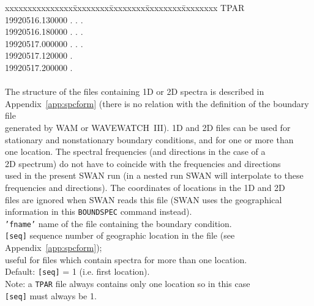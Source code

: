 \documentclass[12pt]{book}
\begin{document}
\begin{tabbing}
                           xxxxxxxxxxxxxxx\=xxxxxxxx\=xxxxxxxx\=xxxxxxxx\=xxxxxxxx \kill
                           TPAR\\
                           19920516.130000   .  .  .\\
                           19920516.180000   .  .  .\\
                           19920517.000000   .   .  .\\
                           19920517.120000     .   \\
                           19920517.200000     .   \\
                                           \>          \>          \>           \>       \\
                        \poptabs
                        The structure of the files containing 1D or 2D spectra is described in\\
                        Appendix~\ref{app:spcform} (there is no relation with the definition of the boundary file\\
                        generated by WAM or WAVEWATCH~III). 1D and 2D files can be used for\\
                        stationary and nonstationary boundary conditions, and for one or more than\\
                        one location. The spectral frequencies (and directions in the case of a\\
                        2D spectrum) do not have to coincide with the frequencies and directions\\
                        used in the present SWAN run (in a nested run SWAN will interpolate to these\\
                        frequencies and directions). The coordinates of locations in the 1D and 2D\\
                        files are ignored when SWAN reads this file (SWAN uses the geographical\\
                        information in this {\tt BOUNDSPEC} command instead).\-\\
{\tt {'fname'}}      \> name of the file containing the boundary condition.\\
{\tt [seq]}          \> sequence number of geographic location in the file (see Appendix~\ref{app:spcform});\+\\
                        useful for files which contain spectra for more than one location.\\
                        Default: {\tt [seq]} = 1 (i.e. first location).\\
                        Note: a {\tt TPAR} file always contains only one location so in this case\\
                        {\tt [seq]} must always be 1.\-\\
\end{tabbing}
\end{document}
